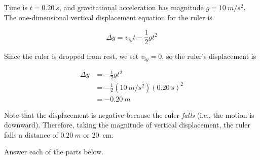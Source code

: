 \documentclass[answers]{exam}
\begin{document}
\begin{questions}
\begin{solutionorbox}[3cm]
Time is $t = \SI{0.20}{s}$, and gravitational acceleration has magnitude $g = \SI{10}{m/s^2}$. The one-dimensional vertical displacement equation for the ruler is

\begin{equation*}
    \Delta y = v_{iy} t - \frac{1}{2} g t^2
\end{equation*}

Since the ruler is dropped from rest, we set $v_{iy} = 0$, so the ruler's displacement is
\vspace{-1em}

\begin{align*}
    \Delta y &= -\frac{1}{2} g t^2 \\[1ex]
    &= -\frac{1}{2} \left(\SI{10}{m/s^2}\right) \left(\SI{0.20}{s}\right)^2 \\[1ex]
    &= -\SI{0.20}{m}
\end{align*}

Note that the displacement is negative because the ruler \textit{falls} (i.e., the motion is downward). Therefore, taking the magnitude of vertical displacement, the ruler falls a distance of $\boxed{\SI{0.20}{m}}$ or \SI{20}{cm}.
\end{solutionorbox}

\question
Answer each of the parts below.

\end{questions}
\end{document}
